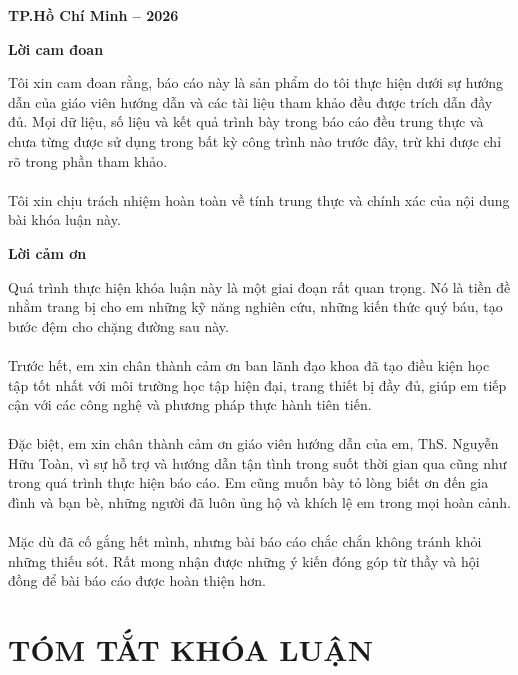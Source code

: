 \documentclass[a4paper,12pt]{article}
\begin{document}
	\vfill %
	\begin{center}
		\textbf{TP.Hồ Chí Minh -- 2026}
	\end{center}
	
	\newpage
	\setcounter{page}{1}
	\begin{center}
		\LARGE \textbf{Lời cam đoan}\\
	\end{center}
	Tôi xin cam đoan rằng, báo cáo này là sản phẩm do tôi thực hiện dưới sự hướng dẫn của giáo viên hướng dẫn và các tài liệu tham khảo đều được trích dẫn đầy đủ. Mọi dữ liệu, số liệu và kết quả trình bày trong báo cáo đều trung thực và chưa từng được sử dụng trong bất kỳ công trình nào trước đây, trừ khi được chỉ rõ trong phần tham khảo.\\\\
	Tôi xin chịu trách nhiệm hoàn toàn về tính trung thực và chính xác của nội dung bài khóa luận này.
	\begin{center}
		\LARGE \textbf{Lời cảm ơn}\\
	\end{center}
	Quá trình thực hiện khóa luận này là một giai đoạn rất quan trọng. Nó là tiền đề nhằm trang bị cho em những kỹ năng nghiên cứu, những kiến thức quý báu, tạo bước đệm cho chặng đường sau này.\\\\
	Trước hết, em xin chân thành cảm ơn ban lãnh đạo khoa đã tạo điều kiện học tập tốt nhất với môi trường học tập hiện đại, trang thiết bị đầy đủ, giúp em tiếp cận với các công nghệ và phương pháp thực hành tiên tiến.\\\\
	Đặc biệt, em xin chân thành cảm ơn giáo viên hướng dẫn của em, ThS. Nguyễn Hữu Toàn, vì sự hỗ trợ và hướng dẫn tận tình trong suốt thời gian qua cũng như trong quá trình thực hiện báo cáo. Em cũng muốn bày tỏ lòng biết ơn đến gia đình và bạn bè, những người đã luôn ủng hộ và khích lệ em trong mọi hoàn cảnh.\\\\
	Mặc dù đã cố gắng hết mình, nhưng bài báo cáo chắc chắn không tránh khỏi những thiếu sót. Rất mong nhận được những ý kiến đóng góp từ thầy và hội đồng để bài báo cáo được hoàn thiện hơn.\\

\newpage
\section*{TÓM TẮT KHÓA LUẬN}
\end{document}
